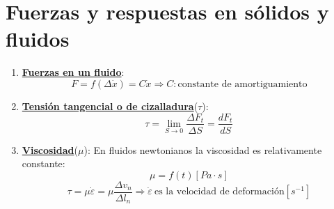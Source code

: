 \section{Fuerzas y respuestas en sólidos y fluidos}
\begin{enumerate}
	\item \underline{\textbf{Fuerzas en un fluido}}:
	\[F=f(\Delta \dot{x})=C\dot{x} \Rightarrow C: \text{constante de amortiguamiento}\]
	
	\item \underline{\textbf{Tensión tangencial o de cizalladura}}($\tau$):
	\[\tau=\lim_{{S \to 0}} \frac{\Delta F_t}{\Delta S}=\frac{dF_t}{dS}\]
	\item \underline{\textbf{Viscosidad}}($\mu$):
	En fluidos newtonianos la viscosidad es relativamente constante: 
	\[\mu=f(t) [Pa \cdot s]\]
	\[\tau =\mu \dot{\varepsilon} = \mu \frac{\Delta v_n}{\Delta l_n} \Rightarrow \dot{\varepsilon}\ \text{es la velocidad de deformación} [s^{-1}]\]


\end{enumerate}
